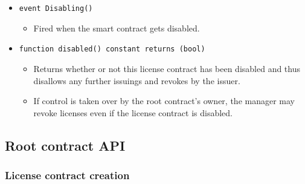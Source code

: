 \documentclass[a4paper]{article}
\begin{document}
\begin{itemize}
  \item \texttt{event Disabling()}
  \begin{itemize}
    \item Fired when the smart contract gets disabled.
  \end{itemize}
    
  \item \texttt{function disabled() constant returns (bool)}
  \begin{itemize}
    \item Returns whether or not this license contract has been disabled and thus disallows any further issuings and revokes by the issuer. 
    \item If control is taken over by the root contract's owner, the manager may revoke licenses even if the license contract is disabled.
  \end{itemize}
\end{itemize}




\subsection{Root contract API}
\label{ch:rootContractAPI}

\subsubsection{License contract creation}
\end{document}
